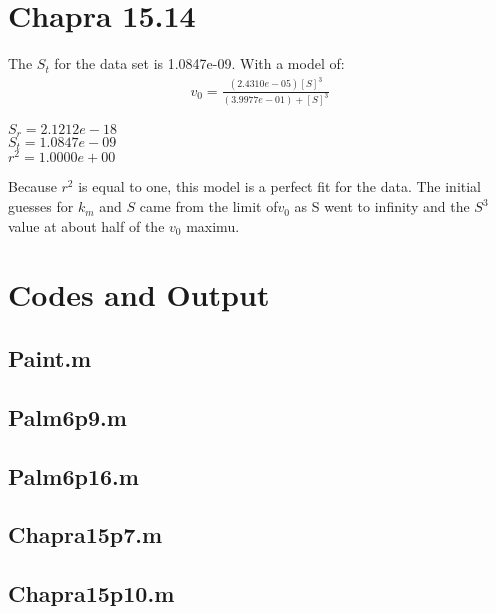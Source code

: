 \documentclass{article}
\begin{document}
\section{Chapra 15.14}
The $S_t$ for the data set is 1.0847e-09.  With a model of:
\begin{align*}
v_0=\frac{(2.4310e-05)[S]^3}{(3.9977e-01)+[S]^3}
\end{align*}
\begin{center}
$S_r = 2.1212e-18$\\     $S_t = 1.0847e-09$\\     $r^2 = 1.0000e+00$\\
\end{center}
Because $r^2$ is equal to one, this model is a perfect fit for the data. The initial guesses for $k_m$ and $S$ came from the limit of$v_0$ as S went to infinity and the $S^3$ value at about half of the $v_0$ maximu.

 
\pagebreak
\appendix
\section{Codes and Output}

\subsection{Paint.m}

\subsection{Palm6p9.m}
\pagebreak

\subsection{Palm6p16.m}
\pagebreak

\subsection{Chapra15p7.m}
\pagebreak

\subsection{Chapra15p10.m}
\pagebreak
\end{document}
